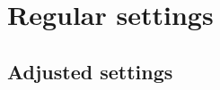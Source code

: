 \documentclass{article}
\begin{document}
\section{Regular settings}
\lipsum

\begin{adjustwidth}{2cm}{}
\section{Adjusted settings}
\lipsum
\end{adjustwidth}
\end{document}
